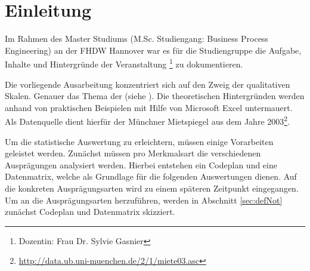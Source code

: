 \section{Einleitung}

Im Rahmen des Master Studiums (M.Sc. Studiengang: Business Process Engineering) an der FHDW Hannover
war es für die Studiengruppe  die Aufgabe, Inhalte und Hintergründe der Veranstaltung \footnote{Dozentin: Frau Dr. Sylvie Gasnier} zu dokumentieren.


Die vorliegende Ausarbeitung konzentriert sich auf den Zweig der qualitativen Skalen. Genauer das Thema der  (siehe ). 
Die theoretischen Hintergründen werden anhand von praktischen Beispielen mit Hilfe von Microsoft Excel untermauert. 
Als Datenquelle dient hierfür der Münchner Mietspiegel aus dem Jahre 2003\footnote{\url{http://data.ub.uni-muenchen.de/2/1/miete03.asc}}.

Um die statistische Auswertung zu erleichtern, müssen einige Vorarbeiten geleistet werden. Zunächst müssen pro Merkmalsart die verschiedenen Ausprägungen 
analysiert werden. Hierbei entstehen ein Codeplan und eine Datenmatrix, welche als Grundlage für die folgenden Auswertungen dienen. 
Auf die konkreten Ausprägungsarten wird zu einem späteren Zeitpunkt eingegangen. Um an die
Ausprägungsarten herzuführen, werden in Abschnitt \ref{sec:defNot} zunächst Codeplan und Datenmatrix
skizziert.
